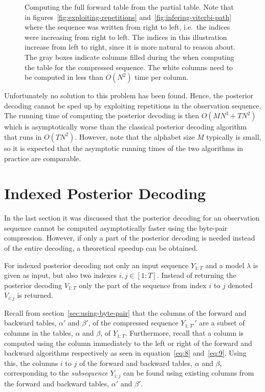 \begin{figure}
  \centering
  
  \caption{Computing the full forward table from the partial table. Note that
    in figures~\ref{fig:exploiting-repetitions}
    and~\ref{fig:infering-viterbi-path} where the sequence was written from
    right to left, i.e.\ the indices were increasing from right to left. The
    indices in this illustration increase from left to right, since it is
    more natural to reason about. The gray boxes indicate columns filled during
    the when computing the table for the compressed sequence. The white columns
    need to be computed in less than $O(N^2)$ time per column.}
  \label{fig:full-forward-table}
\end{figure}

Unfortunately no solution to this problem has been found. Hence, the posterior
decoding cannot be sped up by exploiting repetitions in the observation
sequence. The running time of computing the posterior decoding is then
$O(M N^3 + TN^2)$ which is asymptotically worse than the classical posterior
decoding algorithm that runs in $O(TN^2)$. However, note that the alphabet size
$M$ typically is small, so it is expected that the asymptotic running times of
the two algorithms in practice are comparable.

\section{Indexed Posterior Decoding}

In the last section it was discussed that the posterior decoding for an
observation sequence cannot be computed asymptotically faster using the byte-pair
compression. However, if only a part of the posterior decoding is needed
instead of the entire decoding, a theoretical speedup can be obtained.

For indexed posterior decoding not only an input sequence $Y_{1:T}$ and a model
$\lambda$ is given as input, but also two indexes $i,j \in [1:T]$. Instead of
returning the posterior decoding $V_{1:T}$ only the part of the sequence
from index $i$ to $j$ denoted $V_{i:j}$ is returned.

Recall from section~\ref{sec:using-byte-pair} that the columns of the forward
and backward tables, $\alpha'$ and $\beta'$, of the compressed sequence
$Y_{1:T'}'$ are a subset of columns in the tables, $\alpha$ and $\beta$, of
$Y_{1:T}$. Furthermore, recall that a column is computed using the column
immediately to the left or right of the forward and backward algorithms
respectively as seen in equation~\eqref{eq:8} and~\eqref{eq:9}. Using this, the
columns $i$ to $j$ of the forward and backward tables, $\alpha$ and $\beta$,
corresponding to the \emph{subsequence} $Y_{i:j}$ can be found using existing
columns from the forward and backward tables, $\alpha'$ and $\beta'$.

